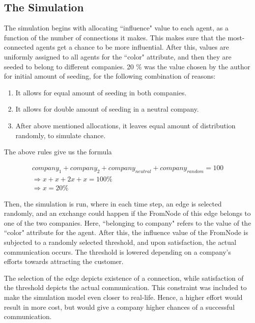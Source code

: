 \subsection{The Simulation} 
 
The simulation begins with allocating ``influence" value to each agent, as a function of the number of connections it makes. This makes sure that the most-connected agents get a chance to be more influential. 
After this, values are uniformly assigned to all agents for the ``color" attribute, and then they are seeded to belong to different companies. 20 \% was the value chosen by the author for initial amount of seeding, for the following combination of reasons:

\begin{enumerate}
\item It allows for equal amount of seeding in both companies.
\item It allows for double amount of seeding in a neutral company.
\item After above mentioned allocations, it leaves equal amount of distribution randomly, to simulate chance.
\end{enumerate}

The above rules give us the formula

\begin{eqnarray}
company_1 + company_2 + company_{neutral} + company_{random} = 100 \nonumber \\
\Rightarrow x + x + 2x + x = 100 \% \nonumber \\
\Rightarrow x = 20 \% 
\label{eqn:seed fraction}
\end{eqnarray}

Then, the simulation is run, where in each time step, an edge is selected randomly, and an exchange could happen if the FromNode of this edge belongs to one of the two companies. Here, ``belonging to company" refers to the value of the ``color" attribute for the agent.
After this, the influence value of the FromNode is subjected to a randomly selected threshold, and upon satisfaction, the actual communication occurs. The threshold is lowered depending on a company's efforts towards attracting the customer. 

The selection of the edge depicts existence of a connection, while satisfaction of the threshold depicts the actual communication. This constraint was included to make the simulation model even closer to real-life. 
Hence, a higher effort would result in more cost, but would give a company higher chances of a successful communication.

